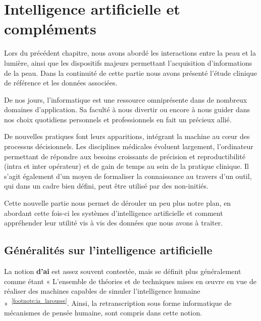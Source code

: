 \chapter{Intelligence artificielle et compléments}
\label{chap:chapter_3}
\chapterintro
Lors du précédent chapitre, nous avons abordé les interactions entre la peau et la lumière, ainsi que les dispositifs majeurs permettant l'acquisition d'informations de la peau. Dans la continuité de cette partie nous avons présenté l'étude clinique de référence et les données associées.\par

De nos jours, l’informatique est une ressource omniprésente dans de nombreux domaines d’application. Sa faculté à nous divertir ou encore à nous guider dans nos choix quotidiens personnels et professionnels en fait un précieux allié.\par 

De nouvelles pratiques font leurs apparitions, intégrant la machine au cœur des processus décisionnels. Les disciplines médicales évoluent largement, l’ordinateur permettant de répondre aux besoins croissants de précision et reproductibilité (intra et inter opérateur) et de gain de temps au sein de la pratique clinique. Il s’agit également d’un moyen de formaliser la connaissance au travers d’un outil, qui dans un cadre bien défini, peut être utilisé par des non-initiés.\par

Cette nouvelle partie nous permet de dérouler un peu plus notre plan, en abordant cette fois-ci les systèmes d'intelligence artificielle et comment appréhender leur utilité vis à vis des données que nous avons à traiter.\par
\newpage

\section{Généralités sur l'intelligence artificielle}
La notion \textbf{d’\gls{ai}} est assez souvent contestée, mais se définit plus généralement comme étant « L’ensemble de théories et de techniques mises en œuvre en vue de réaliser des machines capables de simuler l'intelligence humaine »~\textsuperscript{\ref{footnote:ia_larousse}}. Ainsi, la retranscription sous forme informatique de mécanismes de pensée humaine, sont compris dans cette notion.\par

